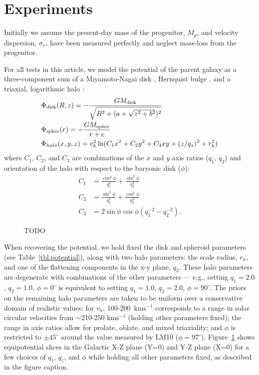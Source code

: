 \documentclass[letterpaper,12pt,preprint]{aastex}
\begin{document}
\section{Experiments}
Initially we assume the present-day mass of the progenitor, $M_p$, and velocity dispersion, $\sigma_v$, have been measured perfectly and neglect mass-loss from the progenitor. 

For all tests in this article, we model the potential of the parent galaxy as a three-component sum of a Miyamoto-Nagai disk \citep{}, Hernquist bulge \citep[spheroid;][]{}, and a triaxial, logarithmic halo \citep[e.g.,][]{law10}:
\begin{align}
	&\Phi_{\rm disk}(R,z) = -\frac{GM_{\rm disk}}{\sqrt{R^2 + (a + \sqrt{z^2 + b^2})^2}}\\
	&\Phi_{\rm spher}(r) = -\frac{GM_{\rm spher}}{r + c}\\
	&\Phi_{halo}(x,y,z) = v_{h}^2 \ln(C_1 x^2 + C_2 y^2 + C_3 xy + (z/q_z)^2 + r_h^2)
\end{align}
where $C_1$, $C_2$, and $C_3$ are combinations of the $x$ and $y$ axis
ratios ($q_1$, $q_2$) and orientation of the halo with respect to the
baryonic disk ($\phi$):
\begin{align}
  C_1 &= \frac{\cos^2\phi}{q_1^2} + \frac{\sin^2\phi}{q_2^2}\\
  C_2 &= \frac{\sin^2\phi}{q_1^2} + \frac{\cos^2\phi}{q_2^2}\\
  C_3 &= 2\sin\phi\cos\phi \left(q_1^{-2} - q_2^{-2}\right).
\end{align}

\begin{figure}[h]
\begin{center}
\caption{ TODO }\label{fig:potential}
\end{center}
\end{figure}
 
When recovering the potential, we hold fixed the disk and spheroid parameters (see Table~\ref{tbl:potential}), along with two halo parameters: the scale radius, $r_h$, and one of the flattening components in the x-y plane, $q_2$. These halo parameters are degenerate with combinations of the other parameters --- e.g., setting $q_1=2.0$, $q_2=1.0$, $\phi=0^\circ$ is equivalent to setting $q_1=1.0$, $q_2=2.0$, $\phi=90^\circ$. The priors on the remaining halo parameters are taken to be uniform over a conservative domain of realistic values: for $v_h$, 100-200~kms$^{-1}$ corresponds to a range in solar circular velocities from $\sim$210-250 kms$^{-1}$ (holding other parameters fixed); the range in axis ratios allow for prolate, oblate, and mixed triaxiality; and $\phi$ is restricted to $\pm45^\circ$ around the value measured by LM10 ($\phi = 97^\circ$). Figure~\ref{fig:potential} shows equipotential slices in the Galactic X-Z plane (Y=0) and Y-Z plane (X=0) for a few choices of  $q_1$,  $q_z$, and $\phi$ while holding all other parameters fixed, as described in the figure caption.
\end{document}
